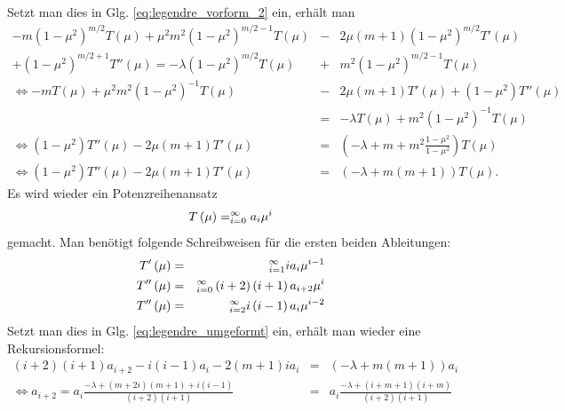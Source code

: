 \documentclass{book}
\let\sum\relax
\DeclareMathOperator*{\sum}{\raisebox{-3.5pt}{\scalebox{2}{\rotatebox{1}{{\bask Σ}}}}}
\begin{document}
%
Setzt man dies in Glg. \eqref{eq:legendre_vorform_2} ein, erhält man
%
\begin{eqnarray}
- m\left(1 - \mu^2\right)^{m/2}T\left(\mu\right) + \mu^2m^2\left(1 - \mu^2\right)^{m/2 - 1}T\left(\mu\right) & - & 2\mu\left(m + 1\right)\left(1 - \mu^2\right)^{m/2}T'\left(\mu\right)\nonumber\\
+ \left(1 - \mu^2\right)^{m/2 + 1}T''\left(\mu\right) = -\lambda\left(1 - \mu^2\right)^{m/2}T\left(\mu\right) & + & m^2\left(1 - \mu^2\right)^{m/2 - 1}T\left(\mu\right)\nonumber\\
\Leftrightarrow -mT\left(\mu\right) + \mu^2m^2\left(1 - \mu^2\right)^{-1}T\left(\mu\right) & - & 2\mu\left(m + 1\right)T'\left(\mu\right) + \left(1 - \mu^2\right)T''\left(\mu\right)\nonumber\\
& = & -\lambda T\left(\mu\right) + m^2\left(1 - \mu^2\right)^{-1}T\left(\mu\right)\nonumber\\
\Leftrightarrow\left(1 - \mu^2\right)T''\left(\mu\right) - 2\mu\left(m + 1\right)T'\left(\mu\right) & = & \left(-\lambda + m + m^2\frac{1 - \mu^2}{1 - \mu^2}\right)T\left(\mu\right)\nonumber\\
\Leftrightarrow\left(1 - \mu^2\right)T''\left(\mu\right) - 2\mu\left(m + 1\right)T'\left(\mu\right) & = & \left(-\lambda + m\left(m + 1\right)\right)T\left(\mu\right).\label{eq:legendre_umgeformt}
\end{eqnarray}
%
Es wird wieder ein Potenzreihenansatz
%
\begin{eqnarray}
T\left(\mu\right) = \sum_{i = 0}^{\infty}a_i\mu^i
\end{eqnarray}
%
gemacht. Man benötigt folgende Schreibweisen für die ersten beiden Ableitungen:
%
\begin{eqnarray}
T'\left(\mu\right) & = & \sum_{i = 1}^{\infty}ia_{i}\mu^{i - 1}\\
T''\left(\mu\right) & = & \sum_{i = 0}^{\infty}\left(i + 2\right)\left(i + 1\right)a_{i + 2}\mu^i\\
T''\left(\mu\right) & = & \sum_{i = 2}^{\infty}i\left(i - 1\right)a_i\mu^{i - 2}
\end{eqnarray}
%
Setzt man dies in Glg. \eqref{eq:legendre_umgeformt} ein, erhält man wieder eine Rekursionsformel:
%
\begin{eqnarray}
\left(i + 2\right)\left(i + 1\right)a_{i + 2} - i\left(i - 1\right)a_i - 2\left(m + 1\right)ia_i & = & \left(-\lambda + m\left(m + 1\right)\right)a_i\nonumber\\
\Leftrightarrow a_{i + 2} = a_i\frac{ - \lambda + \left(m + 2i\right)\left(m + 1\right) + i\left(i - 1\right)}{\left(i + 2\right)\left(i + 1\right)} & = & a_i\frac{ - \lambda + \left(i + m + 1\right)\left(i + m\right)}{\left(i + 2\right)\left(i + 1\right)}
\end{eqnarray}
\end{document}
